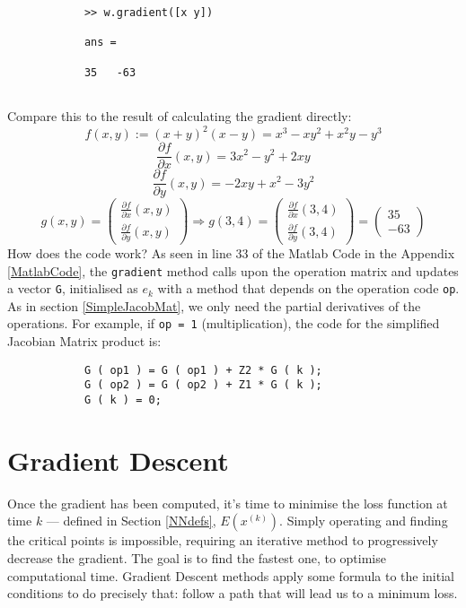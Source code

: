 \documentclass[titlepage]{article}
\theoremstyle{plain}
\theoremstyle{definition}
\begin{document}
		\begin{verbatim}
			>> w.gradient([x y])
			
			ans =
			
			35   -63
			
		\end{verbatim}
		Compare this to the result of calculating the gradient directly:
		$$
		f(x,y) := (x+y)^2 (x-y) = x^3 - x y^2 + x^2 y - y^3
		$$ $$
		\frac{\partial f}{\partial x} (x,y) = 3x^2 - y^2 + 2 x y
		$$ $$
		\frac{\partial f}{\partial y} (x,y) = - 2 x y + x^2 - 3y^2
		$$ $$
		g(x,y)=
		\begin{pmatrix}
		\frac{\partial f}{\partial x} (x,y)\\
		\frac{\partial f}{\partial y} (x,y)
		\end{pmatrix} \Rightarrow g(3,4) =
		\begin{pmatrix}
		\frac{\partial f}{\partial x} (3,4)\\
		\frac{\partial f}{\partial y} (3,4)
		\end{pmatrix} =
		\begin{pmatrix}
		35\\
		-63
		\end{pmatrix}
		$$	
		How does the code work? As seen in line 33 of the Matlab Code in the Appendix \ref{MatlabCode}, the \texttt{gradient} method calls upon the operation matrix and updates a vector \texttt{G}, initialised as $e_k$ with a method that depends on the operation code \texttt{op}. As in section \ref{SimpleJacobMat}, we only need the partial derivatives of the operations. For example, if \texttt{op = 1} (multiplication), the code for the simplified Jacobian Matrix product is:
		
		\begin{verbatim}
			G ( op1 ) = G ( op1 ) + Z2 * G ( k );
			G ( op2 ) = G ( op2 ) + Z1 * G ( k );
			G ( k ) = 0;
		\end{verbatim}
		
	\section{Gradient Descent}\label{GradDesc}
	Once the gradient has been computed, it's time to minimise the loss function at time $k$ --- defined in Section \ref{NNdefs}, $E(x^{(k)})$. Simply operating and finding the critical points is impossible, requiring an iterative method to progressively decrease the gradient. The goal is to find the fastest one, to optimise computational time. Gradient Descent methods apply some formula to the initial conditions to do precisely that: follow a path that will lead us to a minimum loss.\\
\end{document}

